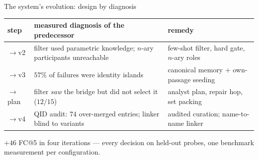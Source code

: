 \documentclass[aspectratio=169,10pt]{beamer}
\begin{document}
\begin{frame}{The system's evolution: design by diagnosis}
\centering
{}

\vspace{1mm}
\scriptsize
\begin{tabular}{lll}
\toprule
step & measured diagnosis of the predecessor & remedy\\
\midrule
$\to$v2 & filter used parametric knowledge; $n$-ary participants unreachable & few-shot filter, hard gate, $n$-ary roles\\
$\to$v3 & $57\%$ of failures were identity islands & canonical memory $+$ own-passage seeding\\
$\to$plan & filter \emph{saw} the bridge but did not select it ($12/15$) & analyst plan, repair hop, set packing\\
$\to$v4 & QID audit: $74$ over-merged entries; linker blind to variants & audited curation; name-to-name linker\\
\bottomrule
\end{tabular}

\vspace{1mm}
\scriptsize $+46$ FC@5 in four iterations --- every decision on held-out
probes, one benchmark measurement per configuration.
\end{frame}
\end{document}
